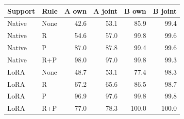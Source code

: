 \begin{tabular}{@{}llrrrr@{}}
\toprule
Support & Rule & A own & A joint & B own & B joint\\
\midrule
Native & None & 42.6 & 53.1 & 85.9 & 99.4\\
Native & R & 54.6 & 57.0 & 99.8 & 99.6\\
Native & P & 87.0 & 87.8 & 99.4 & 99.6\\
Native & R+P & 98.0 & 97.0 & 99.8 & 99.3\\
LoRA & None & 48.7 & 53.1 & 77.4 & 98.3\\
LoRA & R & 67.2 & 65.6 & 86.5 & 98.7\\
LoRA & P & 96.9 & 97.6 & 99.8 & 99.8\\
LoRA & R+P & 77.0 & 78.3 & 100.0 & 100.0\\
\bottomrule
\end{tabular}
